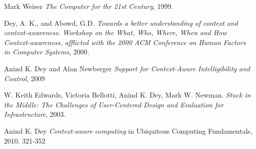 \documentclass[../report.tex]{subfiles}
\begin{document}
\graphicspath{{img/}{../img/}}
\begin{thebibliography}{9}

  Mark Weiser
  \emph{The Computer for thr 21st Century}, 1999.

  Dey, A. K., and Abowd, G.D.
  \emph{Towards a better understanding of context and context-awareness. Workshop on the What, Who, Where, When and How Context-awareness, afflicted with the 2000 ACM Conference on Human Factors in Computer Systems},
  2000.
  
    Anind K. Dey and Alan Newberger
    \emph{Support for Context-Aware Intelligibility and Control}, 2009
  
  
  W. Keith Edwards, Victoria Bellotti, Anind K. Dey,
  Mark W. Newman.
  \emph{Stuck in the Middle: The Challenges of
  User-Centered Design and Evaluation for Infrastructure},
  2003.
  
    Anind K. Dey
    \emph{Context-aware computing} in Ubiquitous Computing Fundamentals, 2010, 321-352

\end{thebibliography}
\end{document}
